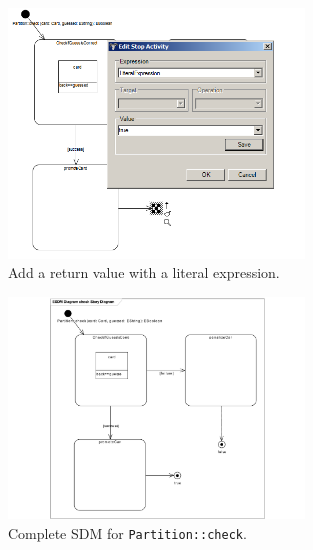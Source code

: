 \begin{figure}[htp]
\begin{center}
  \includegraphics[width=0.7\textwidth]{pics/sdmBilder/check/sdm39}
  \caption{Add a return value with a literal expression.}  
  \label{fig:sdm_check_literal_exp}
\end{center}
\end{figure}

\begin{figure}[htp]
\begin{center}
  \includegraphics[width=0.7\textwidth]{pics/sdmBilder/check/sdm40}
  \caption{Complete SDM for \texttt{Partition::check}.}  
  \label{fig:sdm_check_finish}
\end{center}
\end{figure}

\clearpage 
